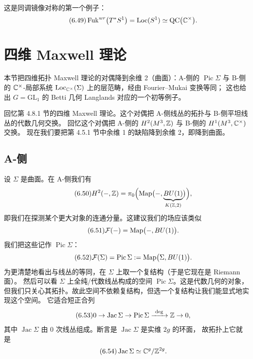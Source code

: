 这是同调镜像对称的第一个例子：
\begin{equation}\tag{6.49}\label{eq:6.49}
\operatorname{Fuk}^{wr}\bigl(T^*S^1\bigr)=\mathrm{Loc}(S^1)\simeq\mathrm{QC}\bigl(\mathbb{C}^{\times}\bigr).
\end{equation}

\section{四维 Maxwell 理论}

\begin{sectionkey}
本节把四维拓扑 Maxwell 理论的对偶降到余维 2（曲面）：A-侧的 $\operatorname{Pic}\Sigma$
与 B-侧的 $\mathbb{C}^\times$-局部系统 $\mathrm{Loc}_{\mathbb{C}^\times}(\Sigma)$ 上的层范畴，经由 Fourier--Mukai 变换等同；
这也给出 $G=\mathrm{GL}_1$ 的 Betti 几何 Langlands 对应的一个初等例子。
\end{sectionkey}

回忆第 4.8.1 节的四维 Maxwell 理论。这个对偶把 A-侧线丛的拓扑与 B-侧平坦线丛的代数几何交换。
回忆这个对偶把 A-侧的 $H^2(M^3,\mathbb{Z})$ 与 B-侧的 $H^1(M^3,\mathbb{C}^{\times})$ 交换。
现在我们要把第 4.5.1 节中余维 1 的缺陷降到余维 2，即降到曲面。

\subsection{A-侧}

设 $\Sigma$ 是曲面。在 A-侧我们有
\begin{equation}\tag{6.50}\label{eq:6.50}
H^2(-,\mathbb{Z})=\pi_0\Bigl(\operatorname{Map}\bigl(-,\underbrace{BU(1)}_{K(\mathbb{Z},2)}\bigr)\Bigr),
\end{equation}
即我们在探测某个更大对象的连通分量。这建议我们的场应该类似
\begin{equation}\tag{6.51}\label{eq:6.51}
\mathcal{F}(-)=\operatorname{Map}\bigl(-,BU(1)\bigr).
\end{equation}
我们把这些记作 $\operatorname{Pic}\Sigma$：
\begin{equation}\tag{6.52}\label{eq:6.52}
\mathcal{F}(\Sigma)=\operatorname{Pic}\Sigma:=\operatorname{Map}\bigl(\Sigma,BU(1)\bigr).
\end{equation}
为更清楚地看出与线丛的等同，在 $\Sigma$ 上取一个复结构（于是它现在是 Riemann 面）。
然后可以看 $\Sigma$ 上全纯/代数线丛构成的空间 $\operatorname{Pic}\Sigma$。这是代数几何的对象，
但我们只关心其拓扑。故此空间不依赖复结构，但选一个复结构让我们能显式地实现这个空间。
它适合短正合列
\begin{equation}\tag{6.53}\label{eq:6.53}
0\to\operatorname{Jac}\Sigma\to\operatorname{Pic}\Sigma\xrightarrow{\ \deg\ }\Z\to 0,
\end{equation}
其中 $\operatorname{Jac}\Sigma$ 由 0 次线丛组成。断言是 $\operatorname{Jac}\Sigma$ 是实维 $2g$ 的环面，
故拓扑上它就是
\begin{equation}\tag{6.54}\label{eq:6.54}
\operatorname{Jac}\Sigma\simeq \mathbb{C}^g/\mathbb{Z}^{2g}.
\end{equation}

